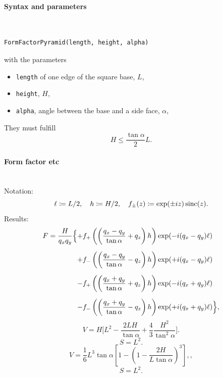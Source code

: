 \FloatBarrier

\paragraph{Syntax and parameters}\strut\\[-2ex plus .2ex minus .2ex]
\begin{lstlisting}[language=python, style=eclipseboxed,numbers=none,nolol]
  FormFactorPyramid(length, height, alpha)
\end{lstlisting}
with the parameters
\begin{itemize}
\item \texttt{length} of one edge of the square base, $L$,  
\item \texttt{height}, $H$,
\item \texttt{alpha}, angle between the base and a side face, $\alpha$,
\end{itemize}
They must fulfill
\begin{displaymath}
  H \le \frac{\tan\alpha}{2}L.
\end{displaymath}


\paragraph{Form factor etc}\strut\\
Notation:
\begin{displaymath}
  \ell\coloneqq L/2,\quad
  h\coloneqq H/2,\quad
  f_\pm(z)\coloneqq \exp(\pm i z)\operatorname{sinc}(z).
\end{displaymath}
Results:
\begin{equation*}
\begin{array}{@{}l@{}l@{}}
\DS F=
\frac{H}{q_xq_y} \Big\{
   &+\DS  f_+\left(\left(\frac{q_x-q_y}{\tan\alpha} +q_z\right)h\right)
        \exp(-i(q_x-q_y)\ell)
\\[3.6ex]
   &\DS+ f_-\left(\left(\frac{q_x-q_y}{\tan\alpha} -q_z\right)h\right)
        \exp(+i(q_x-q_y)\ell)
\\[3.6ex]
   &\DS- f_+\left(\left(\frac{q_x+q_y}{\tan\alpha} +q_z\right)h\right)
        \exp(-i(q_x+q_y)\ell)
\\[3.6ex]
   &\DS- f_-\left(\left(\frac{q_x+q_y}{\tan\alpha} -q_z\right)h\right)
        \exp(+i(q_x+q_y)\ell)
\Big\},
\end{array}
\end{equation*}
\begin{equation*}
  V= H \Big[L^2 - \frac{2LH}{\tan\alpha} + \dfrac{4}{3} \dfrac{H^2}{\tan^2\alpha}\Big].
\end{equation*}
\begin{equation*}
  S=L^2.
\end{equation*}
\begin{equation*}
  V = \dfrac{1}{6}  L^3 \tan\alpha\left[ 1
             - \left(1 - \dfrac{2H}{L\tan\alpha}\right)^3 \right],,
\end{equation*}
\begin{equation*}
  S = L^2.
\end{equation*}

